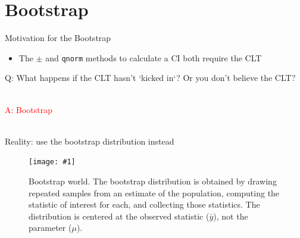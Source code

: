 \documentclass{beamer}\usepackage[]{graphicx}\usepackage[]{color}
\newcommand {\framedgraphiccaption}[2] {
	\begin{figure}
		\centering
		\texttt{[image: \#1]}
		\caption{#2}
	\end{figure}
}
\begin{document}
\section{Bootstrap}

\begin{frame}{Motivation for the Bootstrap}
\begin{itemize}
	\setlength\itemsep{2em}
	\item The $\pm$ and \texttt{qnorm} methods to calculate a CI both require the CLT
\end{itemize}


\vspace*{0.2in}

\Large \textcolor{myblue}{Q: What happens if the CLT hasn't `kicked in`? Or you don't believe the CLT?} \\ \ \\

\pause 

\Large \textcolor{red}{A: Bootstrap} \\ \ \\
\end{frame}



\begin{frame}[fragile]{Reality: use the bootstrap distribution instead}




\framedgraphiccaption{../bootstrap/boot_diag.pdf}{\scriptsize{Bootstrap world. The bootstrap distribution is obtained by drawing repeated samples from an estimate of the population, computing the statistic of interest for each, and collecting those statistics. The distribution is centered at the observed statistic ($\bar{y}$), not the parameter ($\mu$).}}

\end{frame}
\end{document}

